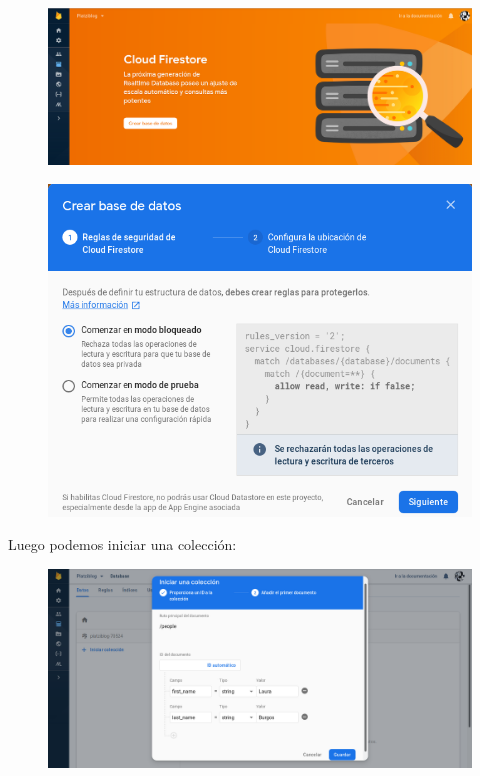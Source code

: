 \documentclass{article}
\begin{document}
\begin{figure}[h!]
  \centering
  \includegraphics[scale=0.5]{./Pictures/169_creando_BD.png}
\end{figure}

\begin{figure}[h!]
  \centering
  \includegraphics[scale=0.65]{./Pictures/170_next.png}
\end{figure}

\newpage

Luego podemos iniciar una colección:\\

\begin{figure}[h!]
  \centering
  \includegraphics[scale=0.5]{./Pictures/171_crear_database.png}
\end{figure}
\end{document}

